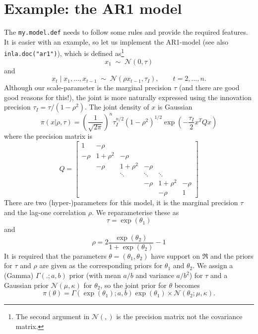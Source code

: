 \documentclass[a4paper,11pt]{article}
\begin{document}
\section*{Example: the AR1 model}

The \texttt{my.model.def} needs to follow some rules and provide the
required features. It is easier with an example, so let us implement
the AR1-model (see also \texttt{inla.doc("ar1")}), which is defined
as\footnote{The second argument in ${\mathcal N}(,)$ is the precision
    matrix not the covariance matrix.}
\begin{displaymath}
    x_{1} \;\sim\; {\mathcal N}(0, \tau)
\end{displaymath}
and
\begin{displaymath}
    x_{t} \mid x_{1}, \ldots, x_{t-1} \;\sim\; {\mathcal N}(\rho
    x_{t-1}, \tau_{I}), \qquad t=2, \ldots,n.
\end{displaymath}
Although our scale-parameter is the marginal precision $\tau$ (and
there are good good reasons for this!), the joint is more naturally
expressed using the innovation precision $\tau_{I} =
\tau/(1-\rho^{2})$. The joint density of $x$ is Gaussian
\begin{displaymath}
    \pi(x|\rho,\tau) = \left(\frac{1}{\sqrt{2\pi}}\right)^{n}
    \tau_{I}^{n/2} (1-\rho^{2})^{1/2}
    \exp\left(-\frac{\tau_{I}}{2} x^{T} Q x\right)
\end{displaymath}
where the precision matrix is
\begin{displaymath}
    Q =
    \begin{bmatrix}
        1 & -\rho &&&& \\
        -\rho & 1+\rho^{2}& -\rho &&& \\
        &-\rho & 1+\rho^{2}& -\rho && \\
        && \ddots& \ddots& \ddots& \\
        &       &       &       -\rho & 1 + \rho^{2} & -\rho\\
        &       &       &       & -\rho & 1
    \end{bmatrix}
\end{displaymath}
There are two (hyper-)parameters for this model, it is the marginal
precision $\tau$ and the lag-one correlation $\rho$.  We
reparameterise these as
\begin{displaymath}
    \tau = \exp(\theta_1) 
\end{displaymath}
and
\begin{displaymath}
    \rho = 2\frac{\exp(\theta_{2})}{1+\exp(\theta_{2})} - 1
\end{displaymath}
It is required that the parameters $\theta = (\theta_{1}, \theta_{2})$
have support on $\Re$ and the priors for $\tau$ and $\rho$ are given
as the corresponding priors for $\theta_{1}$ and $\theta_{2}$. We
assign a (Gamma) $\Gamma(.; a,b)$ prior (with mean $a/b$ and variance
$a/b^{2}$) for $\tau$ and a Gaussian prior ${\mathcal N}(\mu,\kappa)$
for $\theta_{2}$, so the joint prior for $\theta$ becomes
\begin{displaymath}
    \pi(\theta) = \Gamma(\exp(\theta_1); a,b) \exp(\theta_1) \times
    {\mathcal N}(\theta_{2}; \mu, \kappa).
\end{displaymath}
\end{document}
